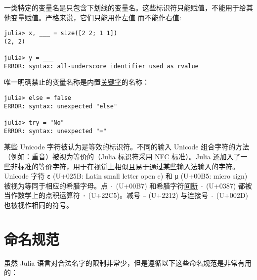 一类特定的变量名是只包含下划线的变量名。这些标识符只能赋值，不能用于给其他变量赋值。严格来说，它们只能用作\href{https://en.wikipedia.org/wiki/Value\_(computer\_science)\#lrvalue}{左值} 而不能作\href{https://en.wikipedia.org/wiki/R-value}{右值}:




\begin{verbatim}
julia> x, ___ = size([2 2; 1 1])
(2, 2)

julia> y = ___
ERROR: syntax: all-underscore identifier used as rvalue
\end{verbatim}



唯一明确禁止的变量名称是内置\hyperlink{15655456628431734346}{关键字}的名称：




\begin{verbatim}
julia> else = false
ERROR: syntax: unexpected "else"

julia> try = "No"
ERROR: syntax: unexpected "="
\end{verbatim}



某些 Unicode 字符被认为是等效的标识符。不同的输入 Unicode 组合字符的方法（例如：重音）被视为等价的（Julia 标识符采用 \href{http://www.macchiato.com/unicode/nfc-faq}{NFC} 标准）。Julia 还加入了一些非标准的等价字符，用于在视觉上相似且易于通过某些输入法输入的字符。Unicode 字符 \texttt{ɛ} (U+025B: Latin small letter open e) 和 \texttt{µ} (U+00B5: micro sign) 被视为等同于相应的希腊字母。点 \texttt{·} (U+00B7) 和希腊字符\href{https://en.wikipedia.org/wiki/Interpunct}{间断} \texttt{·} (U+0387) 都被当作数学上的点积运算符 \texttt{⋅} (U+22C5)。减号 \texttt{−} (U+2212) 与连接号 \texttt{-} (U+002D) 也被视作相同的符号。



\hypertarget{1519367584459167025}{}


\section{命名规范}



虽然 Julia 语言对合法名字的限制非常少，但是遵循以下这些命名规范是非常有用的：



